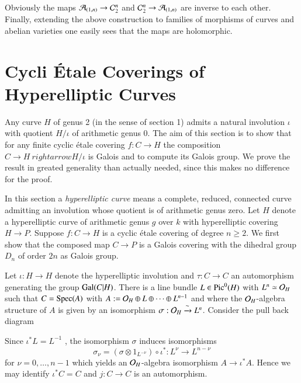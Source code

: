 Obviously the maps $\mathcal{A}_{(1,n)}\rightarrow \mathcal{C}_{2}^{n}$ and $\mathcal{C}_{2}^{n} \rightarrow \mathcal{A}_{(1,n)}$ are inverse to each other. Finally, extending the above construction to families of morphisms of curves and abelian varieties one easily sees that the maps are holomorphic.

\section{Cycli \'Etale Coverings of Hyperelliptic Curves}\label{art11-sec-2}

Any curve $H$ of genus 2 (in the sense of section 1) admits a natural involution $\iota$ with quotient $H/\iota$ of arithmetic genus 0. The aim of this section is to show that for any finite cyclic \'etale covering $f: C\rightarrow H$ the composition $C\rightarrow H\ rightarrow H/\iota$ is Galois and to compute its Galois group. We prove the result in greated generality than actually needed, since this makes no difference for the proof.

In this section a \textit{hyperelliptic curve} means a complete, reduced, connected curve admitting an involution whose quotient is of arithmetic genus zero. Let $H$ denote a hyperelliptic curve of arithmetic genus $g$ over $k$ with hyperelliptic covering $H\rightarrow P$. Suppose $f : C\rightarrow H$ is a cyclic \'etale covering of degree $n \geq 2$. We first show that the composed map $C\rightarrow P$ is a Galois covering with the dihedral group $D_{n}$ of order $2n$ as Galois group.

Let $\iota : H \rightarrow H$ denote the hyperelliptic involution and $\tau : C\rightarrow C$ an automorphism generating the group $\operatorname{Gal}(C | H)$. There is a line bundle $L \in \operatorname{Pic}^{0}(H)$ with $L^{n}\simeq \mathcal{O}_{H}$ such that $C = \operatorname{Spec}(A)$ with $A : =\mathcal{O}_{H} \oplus L \oplus \cdots \oplus L^{n-1}$ and where the $\mathcal{O}_{H}$-algebra structure of $A$ is given by an isomorphism $\sigma : \mathcal{O}_{H} \xrightarrow{\sim}L^{n}$. Consider the pull back diagram

Since $\iota^{*} L =L^{-1}$ , the isomorphism $\sigma $ induces isomorphisms
$$
\sigma_{\nu} = (\sigma \otimes 1_{L^{-\nu}}) \circ \iota^{*} : L^{\nu} \rightarrow L^{n-\nu}
$$
for $\nu = 0,\ldots,n-1$ which yields an  $\mathcal{O}_{H}$-algebra isomorphism $A \rightarrow \iota^{*}A$.
Hence we may identify $\iota^{*}C =C$ and $j:C \rightarrow C$ is an automorphism.

